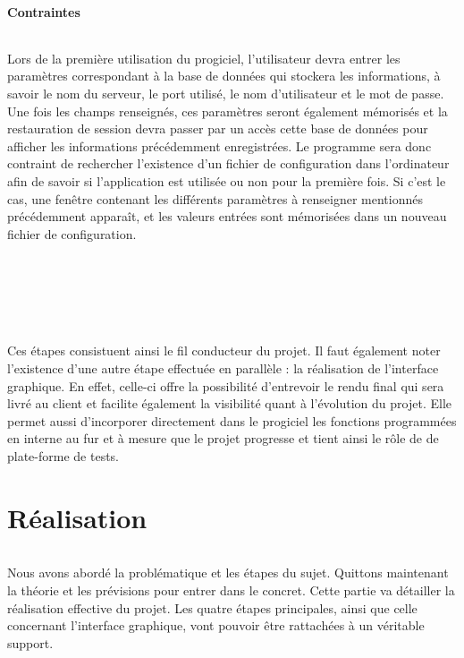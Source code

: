 \documentclass[a4paper,10pt]{report}
\begin{document}
      \subsection{Contraintes}
	\paragraph{}
	  Lors de la première utilisation du progiciel, l'utilisateur devra entrer les paramètres correspondant à la base de données qui stockera les informations, à savoir le nom du serveur, le port utilisé, le nom d'utilisateur et le mot de passe.
	  Une fois les champs renseignés, ces paramètres seront également mémorisés et la restauration de session devra passer par un accès cette base de données pour afficher les informations précédemment enregistrées.
	  Le programme sera donc contraint de rechercher l'existence d'un fichier de configuration dans l'ordinateur afin de savoir si l'application est utilisée ou non pour la première fois.
	  Si c'est le cas, une fenêtre contenant les différents paramètres à renseigner mentionnés précédemment apparaît, et les valeurs entrées sont mémorisées dans un nouveau fichier de configuration.
	  ~\\
	  ~\\
	  ~\\
	  ~\\
	  ~\\
	\paragraph{}
	  Ces étapes consistuent ainsi le fil conducteur du projet. 
	  Il faut également noter l'existence d'une autre étape effectuée en parallèle : la réalisation de l'interface graphique.
	  En effet, celle-ci offre la possibilité d'entrevoir le rendu final qui sera livré au client et facilite également la visibilité quant à l'évolution du projet.
	  Elle permet aussi d'incorporer directement dans le progiciel les fonctions programmées en interne au fur et à mesure que le projet progresse et tient ainsi le rôle de de plate-forme de tests.   
	
\part{Réalisation}
  \setcounter{chapter}{0}
  
	\paragraph{}
	  Nous avons abordé la problématique et les étapes du sujet.
	  Quittons maintenant la théorie et les prévisions pour entrer dans le concret.
	  Cette partie va détailler la réalisation effective du projet.
	  Les quatre étapes principales, ainsi que celle concernant l'interface graphique, vont pouvoir être rattachées à un véritable support.
	  
\end{document}
